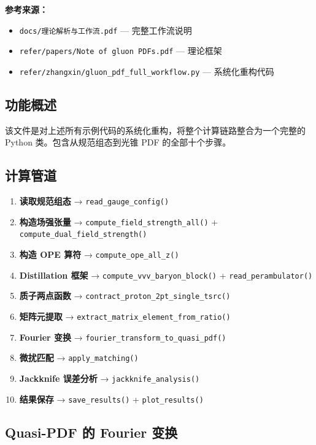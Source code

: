 \documentclass[12pt,a4paper]{ctexart}
\begin{document}
\textbf{参考来源：}
\begin{itemize}
    \item \texttt{docs/理论解析与工作流.pdf} — 完整工作流说明
    \item \texttt{refer/papers/Note of gluon PDFs.pdf} — 理论框架
    \item \texttt{refer/zhangxin/gluon\_pdf\_full\_workflow.py} — 系统化重构代码
\end{itemize}

\subsection{功能概述}

该文件是对上述所有示例代码的系统化重构，将整个计算链路整合为一个完整的 Python 类。包含从规范组态到光锥 PDF 的全部十个步骤。

\subsection{计算管道}

\begin{enumerate}
    \item \textbf{读取规范组态} → \texttt{read\_gauge\_config()}
    \item \textbf{构造场强张量} → \texttt{compute\_field\_strength\_all()} + \texttt{compute\_dual\_field\_strength()}
    \item \textbf{构造 OPE 算符} → \texttt{compute\_ope\_all\_z()}
    \item \textbf{Distillation 框架} → \texttt{compute\_vvv\_baryon\_block()} + \texttt{read\_perambulator()}
    \item \textbf{质子两点函数} → \texttt{contract\_proton\_2pt\_single\_tsrc()}
    \item \textbf{矩阵元提取} → \texttt{extract\_matrix\_element\_from\_ratio()}
    \item \textbf{Fourier 变换} → \texttt{fourier\_transform\_to\_quasi\_pdf()}
    \item \textbf{微扰匹配} → \texttt{apply\_matching()}
    \item \textbf{Jackknife 误差分析} → \texttt{jackknife\_analysis()}
    \item \textbf{结果保存} → \texttt{save\_results()} + \texttt{plot\_results()}
\end{enumerate}

\subsection{Quasi-PDF 的 Fourier 变换}
\end{document}
